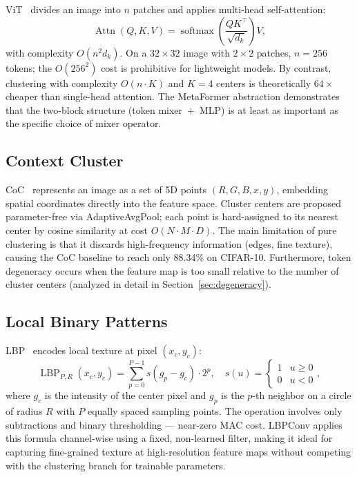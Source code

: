 \documentclass[conference]{IEEEtran}
\begin{document}
ViT~\cite{Dosovitskiy2021ViT} divides an image into $n$ patches and
applies multi-head self-attention:
\begin{equation}
  \operatorname{Attn}(Q,K,V)=
  \operatorname{softmax}\!\!\left(\frac{QK^\top}{\sqrt{d_k}}\right)\!V,
  \label{eq:attn}
\end{equation}
with complexity $O(n^2 d_k)$. On a $32\!\times\!32$ image with
$2\!\times\!2$ patches, $n{=}256$ tokens; the $O(256^2)$ cost is
prohibitive for lightweight models. By contrast, clustering with
complexity $O(n\!\cdot\!K)$ and $K{=}4$ centers is theoretically
$64\!\times$ cheaper than single-head attention. The MetaFormer
abstraction demonstrates that the two-block structure
(token mixer~$+$~MLP) is at least as important as the specific choice
of mixer operator.

\subsection{Context Cluster}

CoC~\cite{Ma2023ImageAsSetOfPoints} represents an image as a set of
5D points $(R,G,B,x,y)$, embedding spatial coordinates directly into
the feature space. Cluster centers are proposed parameter-free via
AdaptiveAvgPool; each point is hard-assigned to its nearest center by
cosine similarity at cost $O(N\!\cdot\!M\!\cdot\!D)$. The main
limitation of pure clustering is that it discards high-frequency
information (edges, fine texture), causing the CoC baseline to reach
only 88.34\% on CIFAR-10. Furthermore, token degeneracy occurs when
the feature map is too small relative to the number of cluster centers
(analyzed in detail in Section~\ref{sec:degeneracy}).

\subsection{Local Binary Patterns}

LBP~\cite{Ojala2002LBP} encodes local texture at pixel $(x_c,y_c)$:
\begin{equation}
  \operatorname{LBP}_{P,R}(x_c,y_c)=
  \sum_{p=0}^{P-1}s(g_p-g_c)\cdot 2^p, \quad
  s(u)=\begin{cases}1 & u\geq0\\0 & u<0\end{cases},
  \label{eq:lbp}
\end{equation}
where $g_c$ is the intensity of the center pixel and $g_p$ is the
$p$-th neighbor on a circle of radius $R$ with $P$ equally spaced
sampling points. The operation involves only subtractions and binary
thresholding --- near-zero MAC cost. LBPConv applies this formula
channel-wise using a fixed, non-learned filter, making it ideal for
capturing fine-grained texture at high-resolution feature maps without
competing with the clustering branch for trainable parameters.
\end{document}

